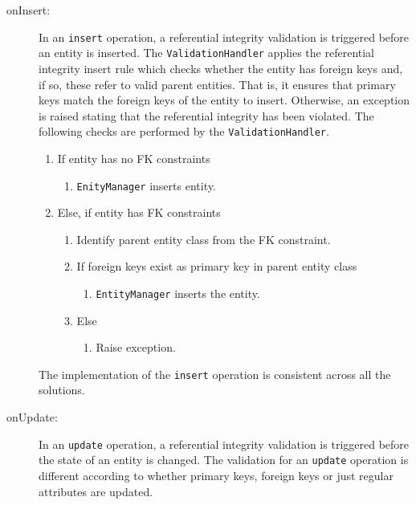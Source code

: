 	\begin{description}
	\item[onInsert:]
		In an \texttt{insert} operation,  a referential
		integrity validation is triggered before an entity is  inserted.  
		The \texttt{ValidationHandler} applies the referential integrity insert
		rule which checks whether the entity has foreign keys and, if so, these refer
		to valid parent entities. That is,  it ensures that  primary keys match the
		foreign keys of the entity to insert.  Otherwise,   an exception is raised
		stating that the referential integrity has been violated. 
		The following checks are performed by the \texttt{ValidationHandler}. 
		\renewcommand{\labelenumii}{\arabic{enumi}. \arabic{enumii}}
		\renewcommand{\labelenumiii}{\arabic{enumi}. \arabic{enumii}. \arabic{enumiii}}
		
		\begin{enumerate}
		\item If entity has no \ac{FK} constraints
				\begin{enumerate}
		  		\item \texttt{EnityManager} inserts entity. 
		  		\end{enumerate}
				
		\item Else,  if entity has \ac{FK} constraints 
		  		\begin{enumerate}
				\item Identify parent entity class from the \ac{FK} constraint. 
				\item If foreign keys exist as  primary key in  parent entity class
				  		\begin{enumerate}
				  		\item \texttt{EntityManager} inserts the entity. 
				  		\end{enumerate}
				\item Else
				   		\begin{enumerate}
				   		  \item Raise exception. 
				   		\end{enumerate}
				\end{enumerate}   	
		\end{enumerate}
		The implementation of the \texttt{insert} operation is consistent across all the
		solutions.  
		
	\item[onUpdate:] 
		In an \texttt{update} operation,  a referential integrity
		validation is triggered before the state of an entity is changed.  The validation
		for an \texttt{update} operation is different according to whether 
		primary keys, foreign keys or just regular attributes are updated. 
		

\end{description}
